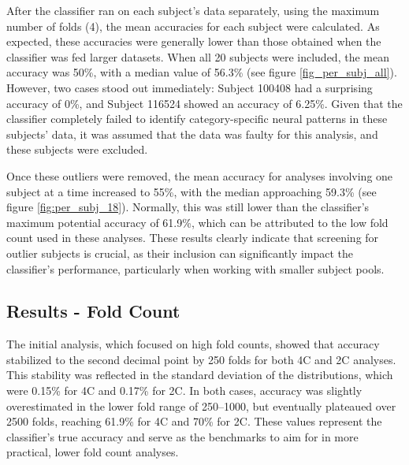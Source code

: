 After the classifier ran on each subject's data separately, using the maximum number of folds (4), the mean accuracies for each subject were calculated. As expected, these accuracies were generally lower than those obtained when the classifier was fed larger datasets. When all 20 subjects were included, the mean accuracy was 50\%, with a median value of 56.3\% (see figure \autoref{fig_per_subj_all}). However, two cases stood out immediately: Subject 100408 had a surprising accuracy of 0\%, and Subject 116524 showed an accuracy of 6.25\%. Given that the classifier completely failed to identify category-specific neural patterns in these subjects' data, it was assumed that the data was faulty for this analysis, and these subjects were excluded.

Once these outliers were removed, the mean accuracy for analyses involving one subject at a time increased to 55\%, with the median approaching 59.3\% (see figure \autoref{fig:per_subj_18}). Normally, this was still lower than the classifier's maximum potential accuracy of 61.9\%, which can be attributed to the low fold count used in these analyses. These results clearly indicate that screening for outlier subjects is crucial, as their inclusion can significantly impact the classifier's performance, particularly when working with smaller subject pools.

\subsection{Results - Fold Count}

The initial analysis, which focused on high fold counts, showed that accuracy stabilized to the second decimal point by 250 folds for both \gls{4C} and \gls{2C} analyses. This stability was reflected in the standard deviation of the distributions, which were 0.15\% for \gls{4C} and 0.17\% for \gls{2C}. In both cases, accuracy was slightly overestimated in the lower fold range of 250–1000, but eventually plateaued over 2500 folds, reaching 61.9\% for \gls{4C} and 70\% for \gls{2C}. These values represent the classifier's true accuracy and serve as the benchmarks to aim for in more practical, lower fold count analyses.

